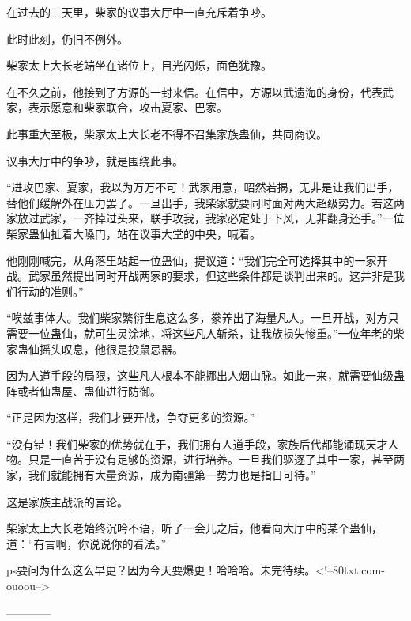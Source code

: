 \begin{this_body}
在过去的三天里，柴家的议事大厅中一直充斥着争吵。

此时此刻，仍旧不例外。

柴家太上大长老端坐在诸位上，目光闪烁，面色犹豫。

在不久之前，他接到了方源的一封来信。在信中，方源以武遗海的身份，代表武家，表示愿意和柴家联合，攻击夏家、巴家。

此事重大至极，柴家太上大长老不得不召集家族蛊仙，共同商议。

议事大厅中的争吵，就是围绕此事。

“进攻巴家、夏家，我以为万万不可！武家用意，昭然若揭，无非是让我们出手，替他们缓解外在压力罢了。一旦出手，我柴家就要同时面对两大超级势力。若这两家放过武家，一齐掉过头来，联手攻我，我家必定处于下风，无非翻身还手。”一位柴家蛊仙扯着大嗓门，站在议事大堂的中央，喊着。

他刚刚喊完，从角落里站起一位蛊仙，提议道：“我们完全可选择其中的一家开战。武家虽然提出同时开战两家的要求，但这些条件都是谈判出来的。这并非是我们行动的准则。”

“唉兹事体大。我们柴家繁衍生息这么多，豢养出了海量凡人。一旦开战，对方只需要一位蛊仙，就可生灵涂地，将这些凡人斩杀，让我族损失惨重。”一位年老的柴家蛊仙摇头叹息，他很是投鼠忌器。

因为人道手段的局限，这些凡人根本不能挪出人烟山脉。如此一来，就需要仙级蛊阵或者仙蛊屋、蛊仙进行防御。

“正是因为这样，我们才要开战，争夺更多的资源。”

“没有错！我们柴家的优势就在于，我们拥有人道手段，家族后代都能涌现天才人物。只是一直苦于没有足够的资源，进行培养。一旦我们驱逐了其中一家，甚至两家，我们就能拥有大量资源，成为南疆第一势力也是指日可待。”

这是家族主战派的言论。

柴家太上大长老始终沉吟不语，听了一会儿之后，他看向大厅中的某个蛊仙，道：“有言啊，你说说你的看法。”

ps要问为什么这么早更？因为今天要爆更！哈哈哈。未完待续。<!--80txt.com-ouoou-->

------------

\end{this_body}

